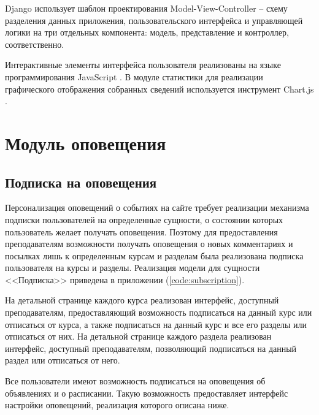 \documentclass[12pt, a4paper, oneside]{article}
\begin{document}
Django использует шаблон проектирования Model-View-Controller – схему разделения данных приложения, пользовательского интерфейса и управляющей логики на три отдельных компонента: модель, представление и контроллер, соответственно.

Интерактивные элементы интерфейса пользователя реализованы на языке программирования JavaScript \cite{js}. В модуле статистики для реализации графического отображения собранных сведений используется инструмент Chart.js \cite{chartjs}.
\newpage

\section{Модуль оповещения}
\subsection{Подписка на оповещения}
Персонализация оповещений о событиях на сайте требует реализации механизма подписки пользователей на определенные сущности, о состоянии которых пользователь желает получать оповещения. Поэтому для предоставления преподавателям возможности получать оповещения о новых комментариях и посылках лишь к определенным курсам и разделам была реализована подписка пользователя на курсы и разделы. Реализация модели для сущности <<Подписка>> приведена в приложении (\ref{code:subscription}).

На детальной странице каждого курса реализован интерфейс, доступный преподавателям, предоставляющий возможность подписаться на данный курс или отписаться от курса, а также подписаться на данный курс и все его разделы или отписаться от них. На детальной странице каждого раздела реализован интерфейс, доступный преподавателям, позволяющий подписаться на данный раздел или отписаться от него.

Все пользователи имеют возможность подписаться на оповещения об объявлениях и о расписании. Такую возможность предоставляет интерфейс настройки оповещений, реализация которого описана ниже.
\end{document}
